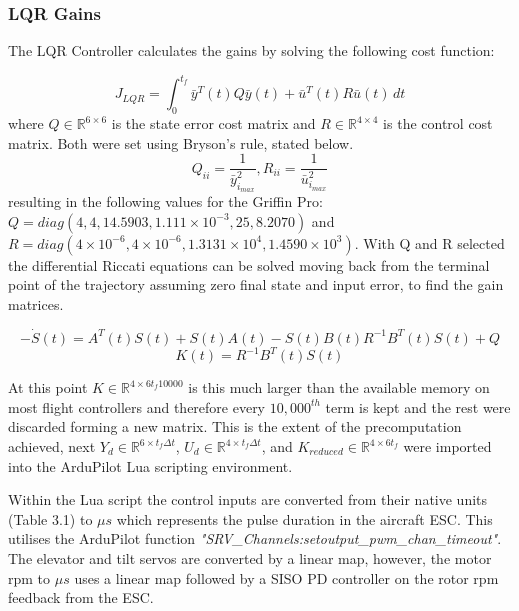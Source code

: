 \subsubsection{LQR Gains}
\label{sec:lqr_gains}
The LQR Controller calculates the gains by solving the following cost function:

\begin{equation}
 J_{LQR}=\int_{0}^{t_{f}}  \bar{y}^{T}(t)Q\bar{y}(t)+\bar{u}^{T}(t)R\bar{u}(t) \,dt
\label{eq:lqr_cost}
\end{equation}
where $Q \in \mathbb{R}^{6\times6}$ is the state error cost matrix and $R \in \mathbb{R}^{4\times4}$ is the control cost matrix. Both were set using Bryson's rule, stated below.
\begin{equation}
Q_{ii}=\frac{1}{\bar{y}_{i_{max}}^2}, R_{ii}=\frac{1}{\bar{u}_{i_{max}}^2}
\label{eq:brysons_rule}
\end{equation}
resulting in the following values for the Griffin Pro: $Q=diag(4,4,14.5903,1.111\times 10^{-3},25,8.2070)$ and $R=diag(4\times 10^{-6},4\times 10^{-6},1.3131\times 10^{4},1.4590\times 10^{3})$. With Q and R selected the differential  Riccati equations can be solved moving back from the terminal point of the trajectory assuming zero final state and input error, to find the gain matrices.

\begin{equation}
-\dot{S}(t)=A^{T}(t)S(t)+S(t)A(t)-S(t)B(t)R^{-1}B^{T}(t)S(t)+Q
\label{eq:riccati}
\end{equation}
\begin{equation}
K(t)=R^{-1}B^{T}(t)S(t)
\label{eq:lqr_gain}
\end{equation}

At this point $K \in \mathbb{R}^{4\times6 t_{f} 10000}$ is this much larger than the available memory on most flight controllers and therefore every $10,000^{th}$ term is kept and the rest were discarded forming a new matrix. This is the extent of the precomputation achieved, next  $Y_d\in \mathbb{R}^{6\times t_{f}\Delta t}$, $U_d\in \mathbb{R}^{4\times t_{f}\Delta t}$, and $K_{reduced}\in \mathbb{R}^{4\times 6 t_{f}}$ were imported into the ArduPilot Lua scripting environment.

Within the Lua script the control inputs are converted from their native units (Table 3.1) to $\mu s$ which represents the pulse duration in the aircraft ESC. This utilises the ArduPilot function \textit{"SRV\_Channels:setoutput\_pwm\_chan\_timeout"}. The elevator and tilt servos are converted by a linear map, however, the motor rpm to $\mu s$ uses a linear map followed by a SISO PD controller on the rotor rpm feedback from the ESC.


